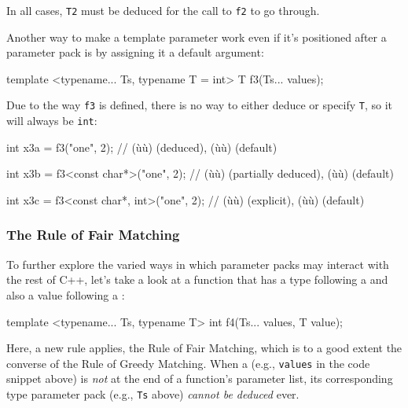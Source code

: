 \noindent In all cases, \lstinline!T2! must be deduced for the call to \lstinline!f2! to
go through.

Another way to make a template parameter work even if it's positioned
after a parameter pack is by assigning it a default argument:

\begin{emcppslisting}[emcppsbatch=e19]
template <typename... Ts, typename T = int>
T f3(Ts... values);
\end{emcppslisting}
    

\noindent Due to the way \lstinline!f3! is defined, there is no way to either deduce
or specify \lstinline!T!, so it will always be \lstinline!int!:

\begin{emcppslisting}[emcppsbatch=e19]
int x3a = f3("one", 2);
    // (ù{}ù) (deduced), (ù{}ù) (default)

int x3b = f3<const char*>("one", 2);
    // (ù{}ù) (partially deduced), (ù{}ù) (default)

int x3c = f3<const char*, int>("one", 2);
    // (ù{}ù) (explicit), (ù{}ù) (default)
\end{emcppslisting}
    

\subsubsection[The Rule of Fair Matching]{The Rule of Fair Matching}\label{the-rule-of-fair-matching}

To further explore the varied ways in which parameter packs may interact
with the rest of C++, let's take a look at a function that has a type
following a  and also a value following
a :

\begin{emcppslisting}[emcppsbatch=e20]
template <typename... Ts, typename T>
int f4(Ts... values, T value);
\end{emcppslisting}
    

\noindent Here, a new rule applies, the Rule of Fair Matching, which is to a good
extent the converse of the Rule of Greedy Matching. When a
 (e.g., \lstinline!values! in the code
snippet above) is \emph{not} at the end of a function's parameter list,
its corresponding type parameter pack (e.g., \lstinline!Ts! above)
\emph{cannot be deduced} ever.

